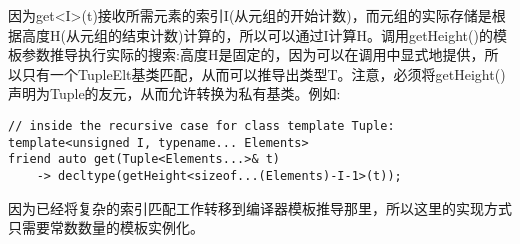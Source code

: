 因为get<I>(t)接收所需元素的索引I(从元组的开始计数)，而元组的实际存储是根据高度H(从元组的结束计数)计算的，所以可以通过I计算H。调用getHeight()的模板参数推导执行实际的搜索:高度H是固定的，因为可以在调用中显式地提供，所以只有一个TupleElt基类匹配，从而可以推导出类型T。注意，必须将getHeight()声明为Tuple的友元，从而允许转换为私有基类。例如:

\begin{lstlisting}[style=styleCXX]
// inside the recursive case for class template Tuple:
template<unsigned I, typename... Elements>
friend auto get(Tuple<Elements...>& t)
	-> decltype(getHeight<sizeof...(Elements)-I-1>(t));
\end{lstlisting}

因为已经将复杂的索引匹配工作转移到编译器模板推导那里，所以这里的实现方式只需要常数数量的模板实例化。









